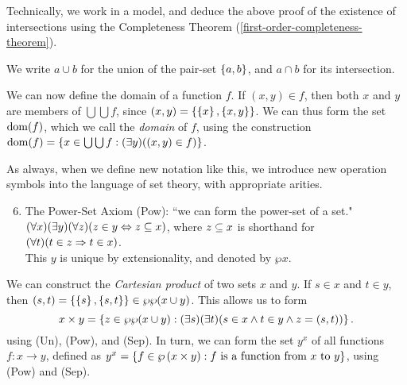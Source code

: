 \documentclass{article}
\begin{document}
\begin{note}
	Technically, we work in a model, and deduce the above proof of the existence of intersections using the Completeness Theorem (\ref{first-order-completeness-theorem}).
\end{note}

\begin{note}
	We write $a \cup b$ for the union of the pair-set $\left\lbrace a, b \right\rbrace$, and $a \cap b$ for its intersection.
\end{note}

\begin{corollary}
    We can now define the domain of a function $f$. If $(x, y) \in f$, then both $x$ and $y$ are members of $\bigcup \bigcup f$, since $(x, y) = \left\lbrace \left\lbrace x \right\rbrace, \left\lbrace x, y \right\rbrace \right\rbrace$. We can thus form the set $\operatorname{dom}(f)$, which we call the \textit{domain} of $f$, using the construction $\operatorname{dom}(f) = \left\lbrace x \in \bigcup\bigcup f : (\exists y)((x, y) \in f) \right\rbrace$.
\end{corollary}

\begin{note}
	As always, when we define new notation like this, we introduce new operation symbols into the language of set theory, with appropriate arities.
\end{note}

\begin{enumerate}
	\setcounter{enumi}{5}
    \item The Power-Set Axiom (Pow): ``we can form the power-set of a set." \\
    $(\forall x)(\exists y)(\forall z)(z \in y \Leftrightarrow z \subseteq x)$, where $z \subseteq x$ is shorthand for $(\forall t)(t \in z \Rightarrow t \in x)$. \\
    This $y$ is unique by extensionality, and denoted by $\wp x$.
\end{enumerate}

\begin{corollary}
    We can construct the \textit{Cartesian product} of two sets $x$ and $y$. If $s \in x$ and $t \in y$, then $(s, t) = \left\lbrace \left\lbrace s \right\rbrace, \left\lbrace s, t \right\rbrace \right\rbrace \in \wp\wp(x \cup y)$. This allows us to form
    \[
	x \times y = \left\lbrace z \in \wp\wp(x \cup y) : (\exists s)(\exists t)(s \in x \land t \in y \land z = (s, t)) \right\rbrace.
	\]
	using (Un), (Pow), and (Sep). In turn, we can form the set $y^x$ of all functions $f: x \to y$, defined as $y^x = \left\lbrace f \in \wp\left(x \times y\right) : f \text{ is a function from $x$ to $y$} \right\rbrace$, using (Pow) and (Sep).
\end{corollary}
\end{document}
